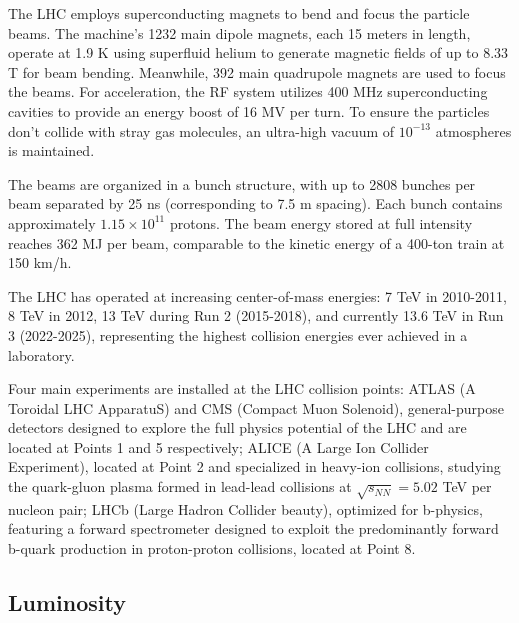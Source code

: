 The LHC employs superconducting magnets to bend and focus the particle beams. The machine's 1232 main dipole magnets, each 15 meters in length, operate at 1.9 K using superfluid helium to generate magnetic fields of up to 8.33 T for beam bending. Meanwhile, 392 main quadrupole magnets are used to focus the beams. For acceleration, the RF system utilizes 400 MHz superconducting cavities to provide an energy boost of 16 MV per turn. To ensure the particles don't collide with stray gas molecules, an ultra-high vacuum of $10^{-13}$ atmospheres is maintained.

The beams are organized in a bunch structure, with up to 2808 bunches per beam separated by 25 ns (corresponding to 7.5 m spacing). Each bunch contains approximately $1.15 \times 10^{11}$ protons. The beam energy stored at full intensity reaches 362 MJ per beam, comparable to the kinetic energy of a 400-ton train at 150 km/h.

The LHC has operated at increasing center-of-mass energies: 7 TeV in 2010-2011, 8 TeV in 2012, 13 TeV during Run 2 (2015-2018), and currently 13.6 TeV in Run 3 (2022-2025), representing the highest collision energies ever achieved in a laboratory.

Four main experiments are installed at the LHC collision points: ATLAS (A Toroidal LHC ApparatuS) and CMS (Compact Muon Solenoid), general-purpose detectors designed to explore the full physics potential of the LHC and are located at Points 1 and 5 respectively; ALICE (A Large Ion Collider Experiment), located at Point 2 and specialized in heavy-ion collisions, studying the quark-gluon plasma formed in lead-lead collisions at $\sqrt{s_{NN}} = 5.02$ TeV per nucleon pair; LHCb (Large Hadron Collider beauty), optimized for b-physics, featuring a forward spectrometer designed to exploit the predominantly forward b-quark production in proton-proton collisions, located at Point 8.


\subsection{Luminosity}

